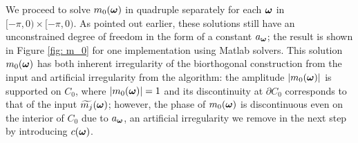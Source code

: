We proceed to solve $m_0(\boldsymbol{\omega})$ in quadruple separately for each $\boldsymbol{\omega}$ in $[-\pi,0)\times [-\pi,0)$. As pointed out earlier, these solutions still have an unconstrained degree of freedom in the form of a constant $a_{\boldsymbol{\omega}}$; the result is shown in Figure \ref{fig: m_0} for one implementation using Matlab solvers. This solution $m_0(\boldsymbol{\omega})$ has both inherent irregularity of the biorthogonal construction from the input and artificial irregularity from the algorithm: the amplitude $|m_0(\boldsymbol{\omega})|$ is supported on $C_0$, where $|m_0(\boldsymbol{\omega})| = 1$ and its discontinuity at $\partial C_0$ corresponds to that of the input $\widetilde{m_{j}}(\boldsymbol{\omega})$; however, the phase of $m_0(\boldsymbol{\omega})$ is discontinuous even on the interior of $C_0$ due to $a_{\boldsymbol{\omega}}$, an artificial irregularity we remove in the next step by introducing $c(\boldsymbol{\omega})$.


